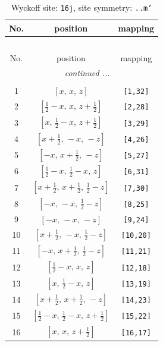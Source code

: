 \documentclass[fleqn,8pt]{jsarticle}
\begin{document}
\renewcommand{\arraystretch}{1.2}
\begin{longtable}{ccc}
\caption{Wyckoff site: {\tt 16j}, site symmetry: {\tt ..m'}}
 \\
 \hline \hline
No. & position & mapping \\ \hline \endfirsthead

\multicolumn{2}{l}{\tablename\ \thetable{}} \\
 \hline \hline
No. & position & mapping \\ \hline \endhead

 \hline \hline
\multicolumn{2}{r}{\footnotesize\it continued ...} \\ \endfoot

 \hline \hline
\multicolumn{2}{r}{} \\ \endlastfoot

1 & $\left[ x,\, x,\, z \right]$ & {\tt [1,32]} \\ \hline
2 & $\left[ \frac{1}{2} - x,\, x,\, z + \frac{1}{2} \right]$ & {\tt [2,28]} \\ \hline
3 & $\left[ x,\, \frac{1}{2} - x,\, z + \frac{1}{2} \right]$ & {\tt [3,29]} \\ \hline
4 & $\left[ x + \frac{1}{2},\, - x,\, - z \right]$ & {\tt [4,26]} \\ \hline
5 & $\left[ - x,\, x + \frac{1}{2},\, - z \right]$ & {\tt [5,27]} \\ \hline
6 & $\left[ \frac{1}{2} - x,\, \frac{1}{2} - x,\, z \right]$ & {\tt [6,31]} \\ \hline
7 & $\left[ x + \frac{1}{2},\, x + \frac{1}{2},\, \frac{1}{2} - z \right]$ & {\tt [7,30]} \\ \hline
8 & $\left[ - x,\, - x,\, \frac{1}{2} - z \right]$ & {\tt [8,25]} \\ \hline
9 & $\left[ - x,\, - x,\, - z \right]$ & {\tt [9,24]} \\ \hline
10 & $\left[ x + \frac{1}{2},\, - x,\, \frac{1}{2} - z \right]$ & {\tt [10,20]} \\ \hline
11 & $\left[ - x,\, x + \frac{1}{2},\, \frac{1}{2} - z \right]$ & {\tt [11,21]} \\ \hline
12 & $\left[ \frac{1}{2} - x,\, x,\, z \right]$ & {\tt [12,18]} \\ \hline
13 & $\left[ x,\, \frac{1}{2} - x,\, z \right]$ & {\tt [13,19]} \\ \hline
14 & $\left[ x + \frac{1}{2},\, x + \frac{1}{2},\, - z \right]$ & {\tt [14,23]} \\ \hline
15 & $\left[ \frac{1}{2} - x,\, \frac{1}{2} - x,\, z + \frac{1}{2} \right]$ & {\tt [15,22]} \\ \hline
16 & $\left[ x,\, x,\, z + \frac{1}{2} \right]$ & {\tt [16,17]} \\
\end{longtable}
\end{document}
